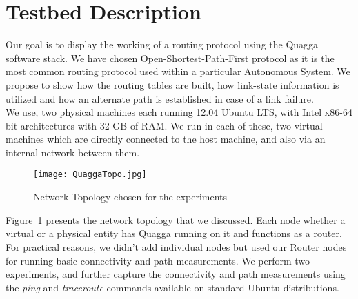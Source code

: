 \documentclass{article}
\begin{document}
\section{Testbed Description}
Our goal is to display the working of a routing protocol using the Quagga software stack.
We have chosen Open-Shortest-Path-First protocol as it is the most common routing protocol used
within a particular Autonomous System. We propose to show how the routing tables are built, 
how link-state information is utilized and how an alternate path is established in case of a link failure.\\
We use, two physical machines each running 12.04 Ubuntu LTS, with Intel x86-64 bit architectures with
32 GB of RAM. We run in each of these, two virtual machines which are directly connected to the host machine,
and also via an internal network between them.\\
\begin{figure}[ht!]
  \centering
  \texttt{[image: QuaggaTopo.jpg]}
  \caption{Network Topology chosen for the experiments}
  \label{fig:networktopo}
\end{figure}
Figure~\ref{fig:networktopo} presents the network topology that we discussed. Each node whether a virtual or a physical
entity has Quagga running on it and functions as a router. For practical reasons, we didn't add individual nodes
but used our Router nodes for running basic connectivity and path measurements. We perform two experiments, and
further capture the connectivity and path measurements using the \textit{ping} and \textit{traceroute} commands 
available on standard Ubuntu distributions.
\end{document}
